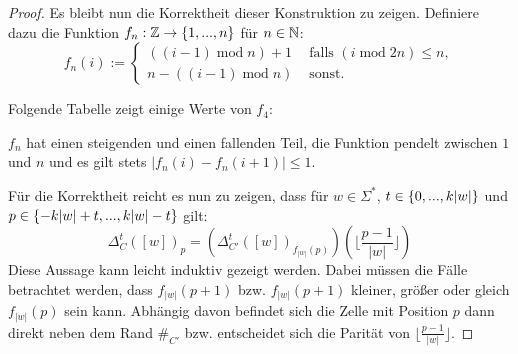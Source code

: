 \begin{proof}
    Es bleibt nun die Korrektheit dieser Konstruktion zu zeigen.
    Definiere dazu die Funktion $f_n: \mathbb{Z} \to \{ { 1, ..., n } \}$ für $n \in \mathbb{N}$:
    \[
        f_n(i) :=
        \begin{cases} 
            ((i - 1) \; \mathrm{mod} \; n) + 1  & \textrm{ falls } (i \; \mathrm{mod} \; 2n) \leq n, \\
            n - ((i - 1) \; \mathrm{mod} \; n)  & \textrm{ sonst.}
        \end{cases}
    \]
    
    Folgende Tabelle zeigt einige Werte von $f_4$:
    \begin{center}
    \end{center}
    
    $f_n$ hat einen steigenden und einen fallenden Teil, die Funktion pendelt zwischen $1$ und $n$
    und es gilt stets $|f_n(i) - f_n(i+1)| \leq 1$.
    
    Für die Korrektheit reicht es nun zu zeigen, dass für $w \in \Sigma^*$, $t \in \{ {0, ..., k|w|} \}$ und $p \in \{ {-k|w|+t, ..., k|w|-t} \}$ gilt:
    \[
        \Delta_C^t([w])_p
            = (\Delta_{C'}^t([w])_{f_{|w|}(p)})(\lfloor \frac{p - 1}{|w|} \rfloor)
    \]
    Diese Aussage kann leicht induktiv gezeigt werden.
    Dabei müssen die Fälle betrachtet werden,
    dass $f_{|w|}(p+1)$ \acs{bzw.} $f_{|w|}(p+1)$
    kleiner, größer oder gleich $f_{|w|}(p)$ sein kann.
    Abhängig davon befindet sich die Zelle mit Position $p$ dann direkt neben dem Rand $\#_{C'}$ \acs{bzw.}
    entscheidet sich die Parität von $\lfloor \frac{p - 1}{|w|} \rfloor$.
    
    \begin{comment}
    $P_{t \in \Nz, n \in \N} := \finset{-kn+t, ..., kn-t}$.
    
        Sei $w \in \Sigma^*$.
        Beweis der Behauptung durch Induktion über $t$.

        Sei $t = 0$, $p \in \finset{1, ..., |w|}$.
        Dann $\Delta_{C'}^0([w])_p = w_p
        = \phi(w_p)(0)
        = (\Delta_{C'}^t([w])_{p})(0)
        = (\Delta_{C'}^t([w])_{f_{|w|}(p)})(\lfloor \frac{p - 1}{|w|} \rfloor)$.
        Sei nun $p \in P_{0,|w|} \setminus \finset{1, ..., |w|}$.
        Dann $\lfloor \frac{p - 1}{|w|} \rfloor \in K \setminus \finset{0}$ und
        $\Delta_{C'}^0([w])_p = \#_C =
        (\Delta_{C'}^t([w])_{f_{|w|}(p)})(\lfloor \frac{p - 1}{|w|} \rfloor)$.
    
    
        Sei $1 \leq t \leq k|w|$.
        Dann gilt das auch, ist aber mühselig. Am liebsten
        würde ich ja einen formalen, Computer-gestützten Beweis führen...
    \end{comment}
\end{proof}

